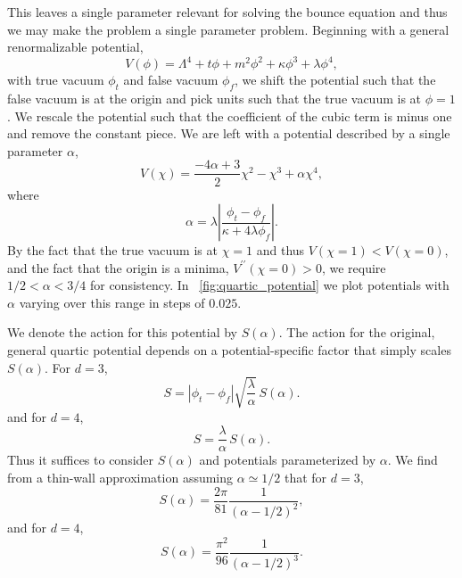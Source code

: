 \documentclass[final,3p,11pt,pdflatex]{elsarticle}
\newcommand{\figref}[1]{\figurename~\ref{#1}}
\newcommand{\fv}{\ensuremath{\phi_f}}
\newcommand{\tv}{\ensuremath{\phi_t}}
\begin{document}
This leaves a single parameter relevant for solving the bounce equation and thus we may make the problem a single parameter problem. Beginning with a general renormalizable potential,
\begin{equation}
\label{eq:general_quartic_potential}
V(\phi) = \Lambda^4 + t \phi + m^2 \phi^2 + \kappa \phi ^3 + \lambda \phi^4,
\end{equation}
with true vacuum $\tv$ and false vacuum $\fv$, we shift the potential such that the false vacuum is at the origin and pick units such that the true vacuum is at $\phi= 1$. We rescale the potential such that the coefficient of the cubic term is minus one and remove the constant piece. We are left with a potential described by a single parameter $\alpha$,
\begin{equation}\label{eq:one_dim_simplified}
V(\chi) = \frac{-4 \alpha +3}{2} \chi^2 - \chi ^3 + \alpha \chi^4,
\end{equation}
where
\begin{equation}
\alpha = \lambda \left|\frac{\tv - \fv}{\kappa + 4 \lambda \fv}\right|.
\end{equation}
By the fact that the true vacuum is at $\chi = 1$ and thus $V(\chi=1) < V(\chi=0)$, and the fact that the origin is a minima, $V^{\prime\prime}(\chi=0) > 0$, we require $1/2 < \alpha < 3 /4$ for consistency.  In \figref{fig:quartic_potential} we plot potentials with $\alpha$ varying over this range in steps of $0.025$.

We denote the action for this potential by $S(\alpha)$. The action for the original, general quartic potential depends on a potential-specific factor that simply scales $S(\alpha)$. For $d=3$,
\begin{equation}
S = |\tv - \fv| \sqrt{\frac{\lambda}{\alpha}} \, S(\alpha).
\end{equation}
and for $d=4$,
\begin{equation}
S = \frac{\lambda}{\alpha} \, S(\alpha).
\end{equation}
Thus it suffices to consider $S(\alpha)$ and potentials parameterized by
$\alpha$. We find from a thin-wall approximation assuming
$\alpha \simeq 1/2$ that for $d=3$,
\begin{equation}\label{eq:action_alpha_thin_3}
S(\alpha) = \frac{2 \pi }{81} \frac{1}{(\alpha - 1/2)^2},
\end{equation}
and for $d=4$,
\begin{equation}
S(\alpha) = \frac{\pi^2}{96} \frac{1}{(\alpha - 1/2)^3}.
\end{equation}
\end{document}
